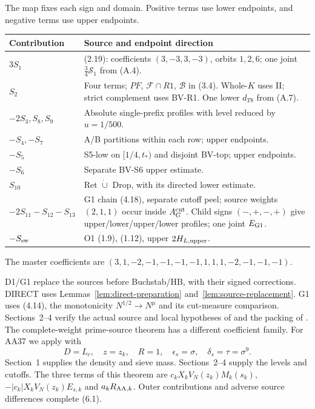 The map fixes each sign and domain.
Positive terms use lower endpoints, and negative terms use upper endpoints.
\begin{longtable}{@{}p{}p{}@{}}
\toprule
Contribution & Source and endpoint direction \\\midrule
$3S_1$ & (2.19): coefficients $(3,-3,3,-3)$, orbits $1,2,6$; one joint $\tfrac34\mathcal S_1$ from (A.4). \\
$S_2$ & Four terms; $PF$, $\mathcal F\cap R1$, $\mathcal B$ in (3.4). Whole-$K$ uses II; strict complement uses BV-R1. One lower $d_{T8}$ from (A.7). \\
$-2S_3,S_8,S_9$ & Absolute single-prefix profiles with level reduced by $u=1/500$. \\
$-S_4,-S_7$ & A/B partitions within each row; upper endpoints. \\
$-S_5$ & S5-low on $[1/4,t_*)$ and disjoint BV-top; upper endpoints. \\
$-S_6$ & Separate BV-S6 upper estimate. \\
$S_{10}$ & Ret $\dot\cup$ Drop, with its directed lower estimate. \\
$-2S_{11}-S_{12}-S_{13}$ & G1 chain (4.18), separate cutoff peel; source weights $(2,1,1)$ occur inside $A_G^{\rm cut}$. Child signs $(-,+,-,+)$ give upper/lower/upper/lower profiles; one joint $E_{\rm G1}$. \\
$-S_{\rm sw}$ & O1 (1.9), (1.12), upper $2H_{L,\rm upper}$. \\
\bottomrule
\end{longtable}
The master coefficients are
$(3,1,-2,-1,-1,-1,-1,1,1,1,-2,-1,-1,-1)$.

D1/G1 replace the sources before Buchstab/HB, with their signed corrections.
DIRECT uses Lemmas~\ref{lem:direct-preparation} and~\ref{lem:source-replacement}.
G1 uses (4.14), the monotonicity $N^{1/2}\to N^\mu$ and its cut-measure comparison.
Sections~2--4 verify the actual source and local hypotheses of
\cite[Theorem~3.2, (3.13)]{Z1} and the packing of \cite[Theorem~4.1]{Z1}.
The complete-weight prime-source theorem has a different coefficient family.
For AA37 we apply \cite[Theorem~2.6, (2.30)--(2.33b)]{Z1} with
\[
D=L_c,\quad z=z_k,\quad R=1,\quad
\epsilon_s=\sigma,\quad\delta_s=\tau=\sigma^9.
\]
Section~1 supplies the density and sieve mass.
Sections~2--4 supply the levels and cutoffs.
The three terms of this theorem are $c_kX_kV_N(z_k)M_k(s_k)$,
$-|c_k|X_kV_N(z_k)E_{s,k}$ and $a_kR_{{\rm AA},k}$.
Outer contributions and adverse source differences complete (6.1).

